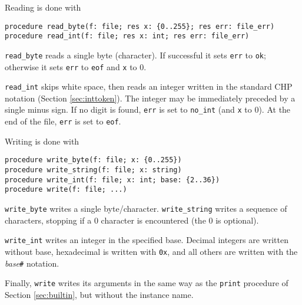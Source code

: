 Reading is done with
\begin{verbatim}
procedure read_byte(f: file; res x: {0..255}; res err: file_err)
procedure read_int(f: file; res x: int; res err: file_err)
\end{verbatim}
\verb|read_byte| reads a single byte (character). If successful it sets \verb|err|
to \verb|ok|; otherwise it sets \verb|err| to \verb|eof| and \verb|x| to 0.

\verb|read_int| skips white space, then reads an integer written in the standard
CHP notation (Section \ref{sec:inttoken}). The integer may be immediately
preceded by a single minus sign. If no digit is found,
\verb|err| is set to \verb|no_int| (and \verb|x| to 0). At the end of the
file, \verb|err| is set to \verb|eof|.

Writing is done with
\begin{verbatim}
procedure write_byte(f: file; x: {0..255})
procedure write_string(f: file; x: string)
procedure write_int(f: file; x: int; base: {2..36})
procedure write(f: file; ...)
\end{verbatim}
\verb|write_byte| writes a single byte/character. \verb|write_string| writes
a sequence of characters, stopping if a 0 character is encountered (the 0
is optional).

\verb|write_int| writes an integer in the specified base. Decimal integers
are written without base, hexadecimal is written with \verb|0x|, and all
others are written with the {\it{}base}\verb|#| notation.

Finally, \verb|write| writes its arguments in the same way as the \verb|print|
procedure of Section \ref{sec:builtin}, but without the instance name.


